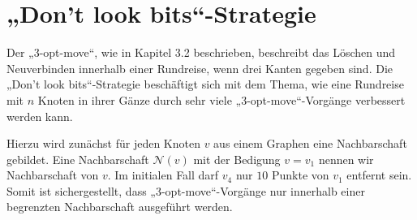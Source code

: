\section{„Don't look bits“-Strategie}
Der „3-opt-move“, wie in  Kapitel 3.2 beschrieben, beschreibt das Löschen
und Neuverbinden innerhalb einer Rundreise, wenn drei
Kanten gegeben sind. Die „Don't look bits“-Strategie beschäftigt sich
mit dem Thema, wie eine Rundreise mit $n$ Knoten in ihrer Gänze durch
sehr viele „3-opt-move“-Vorgänge verbessert werden kann.

Hierzu wird zunächst für jeden Knoten $v$ aus einem Graphen
eine Nachbarschaft gebildet. Eine Nachbarschaft $\mathcal{N}(v)$ mit der
Bedigung $v = v_1$ nennen wir Nachbarschaft von $v$. Im initialen Fall 
darf $v_4$ nur $10$ Punkte von $v_1$
entfernt sein. Somit ist sichergestellt, dass „3-opt-move“-Vorgänge nur
innerhalb einer begrenzten Nachbarschaft ausgeführt werden.

